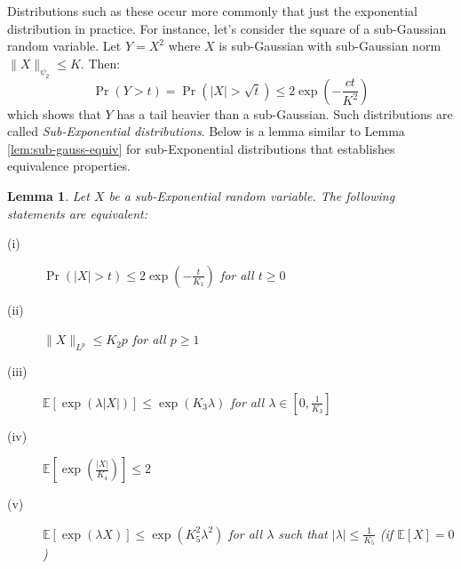 \documentclass{article}
\newtheorem{lemma}{Lemma}[subsection]
\theoremstyle{remark}
\newcommand{\Exp}{\mathbb{E}}
\begin{document}
Distributions such as these occur more commonly that just the exponential distribution in practice. For instance, let's consider the square of a sub-Gaussian random variable. Let \(Y = X^{2}\) where \(X\) is sub-Gaussian with sub-Gaussian norm \(\|X\|_{\psi_{2}} \leq K\). Then:
\begin{equation*}
\Pr(Y > t) = \Pr(|X| > \sqrt{t}) \leq 2\exp\left(-\frac{ct}{K^{2}}\right)
\end{equation*}
which shows that \(Y\) has a tail heavier than a sub-Gaussian. Such distributions are called \emph{Sub-Exponential distributions}. Below is a lemma similar to Lemma \ref{lem:sub-gauss-equiv} for sub-Exponential distributions that establishes equivalence properties.

\begin{lemma}
\label{lem:sub-exp-equiv}
Let \(X\) be a sub-Exponential random variable. The following statements are equivalent:
\begin{description}
\item [(i)] \(\Pr(|X| > t) \leq 2\exp\left(-\frac{t}{K_{1}}\right)\) for all \(t \geq 0\)
\item [(ii)] \(\|X\|_{L^{p}} \leq K_{2}p\) for all \(p \geq 1\)
\item [(iii)] \(\Exp[\exp(\lambda|X|)] \leq \exp(K_{3}\lambda)\) for all \(\lambda \in \left[0, \frac{1}{K_{3}}\right]\)
\item [(iv)] \(\Exp\left[\exp\left(\frac{|X|}{K_{4}}\right)\right] \leq 2\)
\item [(v)] \(\Exp[\exp(\lambda X)] \leq \exp(K_{5}^{2}\lambda^{2})\) for all \(\lambda\) such that \(|\lambda| \leq \frac{1}{K_{5}}\) (if \(\Exp[X] = 0\))
\end{description}
\end{lemma}
\end{document}
